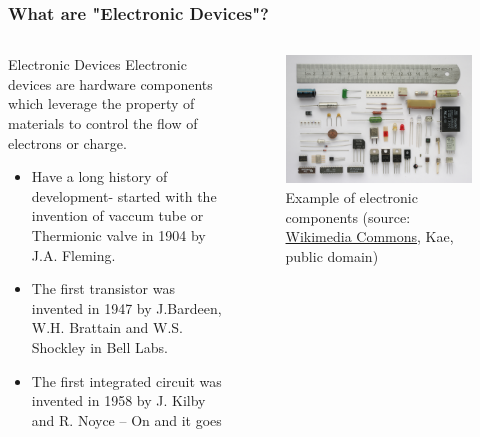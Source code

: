 \begin{frame}
	\frametitle{What are "Electronic Devices"?}
	\begin{columns}
		\begin{column}{0.5\textwidth}
			\begin{varblock}{Electronic Devices}
				Electronic devices are hardware components which leverage the property of materials to control the flow of electrons or charge.
			\end{varblock} \vspace{-0.5cm}		
			\begin{itemize}
				\item<2-> Have a long history of development- started with the invention of vaccum tube or Thermionic valve in 1904 by J.A. Fleming.
				\item<3-> The first transistor was invented in 1947 by J.Bardeen, W.H. Brattain and W.S. Shockley in Bell Labs.
				\item<4-> The first integrated circuit was invented in 1958 by J. Kilby and R. Noyce -- On and it goes
			\end{itemize}
		\end{column}
		\begin{column}{0.5\textwidth}
			\begin{figure}
				\centering
				\includegraphics[scale= 0.05]{fig/lec01/Componentes.jpg}
				\caption{Example of electronic components (source: \href{https://commons.wikimedia.org/wiki/File:Componentes.JPG}{Wikimedia Commons}, Kae, public domain)}
			\end{figure}
		\end{column}
		\end{columns}
\end{frame}

